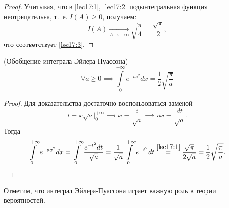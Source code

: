 \documentclass[../../main.tex]{subfiles}
\begin{document}
\begin{proof}
    Учитывая, что в \eqref{lec17:1}, \eqref{lec17:2} 
    подынтегральная функция неотрицательна, т.~е.
    $I(A) \geq 0$, получаем:
    \[
     I(A)\xrightarrow[A\to +\infty]{} 
     \sqrt{\frac{\pi}{4}} = \frac{\sqrt{\pi}}{2},
	\]
	что соответствует \eqref{lec17:3}.
\end{proof}

\begin{crl*}
 (Обобщение интеграла Эйлера-Пуассона)
    \begin{equation}
		 	\label{lec17:9}
		 	\forall a \geq 0 \implies \int\limits_0^{+\infty}e^{-ax^2}dx = 
		 	\frac{1}{2}\sqrt{\frac{\pi}{a}}
    \end{equation}
\end{crl*}
\begin{proof}
 Для доказательства достаточно воспользоваться заменой
 \begin{equation*}
  t = x\sqrt{a}\Big|_0^{+\infty} \implies x = \frac{t}{\sqrt{a}} 
  \implies dx = \frac{dt}{\sqrt{a}}.
 \end{equation*}
  Тогда
\begin{equation*}
    \int\limits_0^{+\infty}e^{-ax^2}dx = 
    \int\limits_{0}^{+\infty}\frac{e^{-t^2}dt}{\sqrt{a}} = 
    \frac{1}{\sqrt{a}} \int\limits_{0}^{+\infty}e^{-t^2}dt 
    \overset{\eqref{lec17:1}}=
    \frac{\sqrt{\pi}}{2\sqrt{a}} =
    \frac{1}{2}\sqrt{\frac{\pi}{a}}.
    \qedhere
\end{equation*}
\end{proof}
Отметим, что интеграл Эйлера-Пуассона играет 
важную роль в теории вероятностей.
\end{document}
